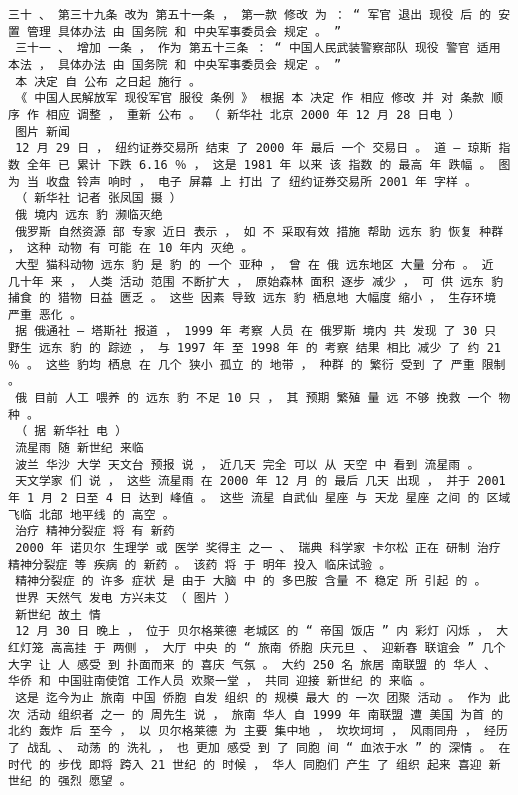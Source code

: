 \documentclass{article}
\begin{document}
\begin{Verbatim}[commandchars=\\\{\}]
 三十 、 第三十九条 改为 第五十一条 ， 第一款 修改 为 ： “ 军官 退出 现役 后 的 安置 管理 具体办法 由 国务院 和 中央军事委员会 规定 。 ” 
 三十一 、 增加 一条 ， 作为 第五十三条 ： “ 中国人民武装警察部队 现役 警官 适用 本法 ， 具体办法 由 国务院 和 中央军事委员会 规定 。 ” 
 本 决定 自 公布 之日起 施行 。 
 《 中国人民解放军 现役军官 服役 条例 》 根据 本 决定 作 相应 修改 并 对 条款 顺序 作 相应 调整 ， 重新 公布 。 （ 新华社 北京 2000 年 12 月 28 日电 ） 
 图片 新闻 
 12 月 29 日 ， 纽约证券交易所 结束 了 2000 年 最后 一个 交易日 。 道 — 琼斯 指数 全年 已 累计 下跌 6.16 ％ ， 这是 1981 年 以来 该 指数 的 最高 年 跌幅 。 图为 当 收盘 铃声 响时 ， 电子 屏幕 上 打出 了 纽约证券交易所 2001 年 字样 。 
 （ 新华社 记者 张凤国 摄 ） 
 俄 境内 远东 豹 濒临灭绝 
 俄罗斯 自然资源 部 专家 近日 表示 ， 如 不 采取有效 措施 帮助 远东 豹 恢复 种群 ， 这种 动物 有 可能 在 10 年内 灭绝 。 
 大型 猫科动物 远东 豹 是 豹 的 一个 亚种 ， 曾 在 俄 远东地区 大量 分布 。 近 几十年 来 ， 人类 活动 范围 不断扩大 ， 原始森林 面积 逐步 减少 ， 可 供 远东 豹 捕食 的 猎物 日益 匮乏 。 这些 因素 导致 远东 豹 栖息地 大幅度 缩小 ， 生存环境 严重 恶化 。 
 据 俄通社 — 塔斯社 报道 ， 1999 年 考察 人员 在 俄罗斯 境内 共 发现 了 30 只 野生 远东 豹 的 踪迹 ， 与 1997 年 至 1998 年 的 考察 结果 相比 减少 了 约 21 ％ 。 这些 豹均 栖息 在 几个 狭小 孤立 的 地带 ， 种群 的 繁衍 受到 了 严重 限制 。 
 俄 目前 人工 喂养 的 远东 豹 不足 10 只 ， 其 预期 繁殖 量 远 不够 挽救 一个 物种 。 
 （ 据 新华社 电 ） 
 流星雨 随 新世纪 来临 
 波兰 华沙 大学 天文台 预报 说 ， 近几天 完全 可以 从 天空 中 看到 流星雨 。 
 天文学家 们 说 ， 这些 流星雨 在 2000 年 12 月 的 最后 几天 出现 ， 并于 2001 年 1 月 2 日至 4 日 达到 峰值 。 这些 流星 自武仙 星座 与 天龙 星座 之间 的 区域 飞临 北部 地平线 的 高空 。 
 治疗 精神分裂症 将 有 新药 
 2000 年 诺贝尔 生理学 或 医学 奖得主 之一 、 瑞典 科学家 卡尔松 正在 研制 治疗 精神分裂症 等 疾病 的 新药 。 该药 将 于 明年 投入 临床试验 。 
 精神分裂症 的 许多 症状 是 由于 大脑 中 的 多巴胺 含量 不 稳定 所 引起 的 。 
 世界 天然气 发电 方兴未艾 （ 图片 ） 
 新世纪 故土 情 
 12 月 30 日 晚上 ， 位于 贝尔格莱德 老城区 的 “ 帝国 饭店 ” 内 彩灯 闪烁 ， 大 红灯笼 高高挂 于 两侧 ， 大厅 中央 的 “ 旅南 侨胞 庆元旦 、 迎新春 联谊会 ” 几个 大字 让 人 感受 到 扑面而来 的 喜庆 气氛 。 大约 250 名 旅居 南联盟 的 华人 、 华侨 和 中国驻南使馆 工作人员 欢聚一堂 ， 共同 迎接 新世纪 的 来临 。 
 这是 迄今为止 旅南 中国 侨胞 自发 组织 的 规模 最大 的 一次 团聚 活动 。 作为 此次 活动 组织者 之一 的 周先生 说 ， 旅南 华人 自 1999 年 南联盟 遭 美国 为首 的 北约 轰炸 后 至今 ， 以 贝尔格莱德 为 主要 集中地 ， 坎坎坷坷 ， 风雨同舟 ， 经历 了 战乱 、 动荡 的 洗礼 ， 也 更加 感受 到 了 同胞 间 “ 血浓于水 ” 的 深情 。 在 时代 的 步伐 即将 跨入 21 世纪 的 时候 ， 华人 同胞们 产生 了 组织 起来 喜迎 新世纪 的 强烈 愿望 。 

\end{Verbatim}
\end{document}
